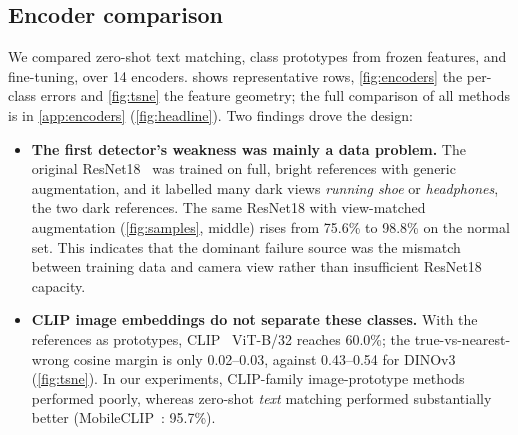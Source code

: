 \subsection{Encoder comparison}
We compared zero-shot text matching, class prototypes from frozen features, and fine-tuning, over 14 encoders.  shows representative rows, \cref{fig:encoders} the per-class errors and \cref{fig:tsne} the feature geometry; the full comparison of all methods is in \cref{app:encoders} (\cref{fig:headline}). Two findings drove the design:
\begin{itemize}[nosep,leftmargin=*]
  \item \textbf{The first detector's weakness was mainly a data problem.} The original ResNet18~\cite{he2016resnet} was trained on full, bright references with generic augmentation, and it labelled many dark views \emph{running shoe} or \emph{headphones}, the two dark references. The same ResNet18 with view-matched augmentation (\cref{fig:samples}, middle) rises from 75.6\% to 98.8\% on the normal set. This indicates that the dominant failure source was the mismatch between training data and camera view rather than insufficient ResNet18 capacity.
  \item \textbf{CLIP image embeddings do not separate these classes.} With the references as prototypes, CLIP~\cite{radford2021clip} ViT-B/32 reaches 60.0\%; the true-vs-nearest-wrong cosine margin is only 0.02--0.03, against 0.43--0.54 for DINOv3 (\cref{fig:tsne}). In our experiments, CLIP-family image-prototype methods performed poorly, whereas zero-shot \emph{text} matching performed substantially better (MobileCLIP~\cite{vasu2024mobileclip}: 95.7\%).
\end{itemize}

